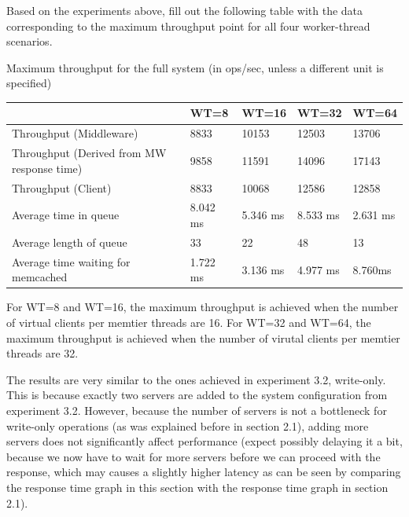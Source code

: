 \documentclass[11pt,a4paper]{article}
\begin{document}
Based on the experiments above, fill out the following table with the data corresponding to the maximum throughput point for all four worker-thread scenarios.

\begin{center}
	{Maximum throughput for the full system (in ops/sec, unless a different unit is specified) }
	\begin{tabular}{|l|p{1.5cm}|p{1.5cm}|p{1.5cm}|p{1.5cm}|}
		\hline                                            									& WT=8 & WT=16 & WT=32 & WT=64 \\ 
		\hline Throughput (Middleware)   								& 8833 & 10153 & 12503 & 13706 \\ 
		\hline Throughput (Derived from MW response time) & 9858 & 11591 & 14096 & 17143  \\ 
		\hline Throughput (Client)              								& 8833 & 10068 & 12586 & 12858 \\ 
		\hline Average time in queue            							& 8.042 ms & 5.346 ms &  8.533 ms & 2.631 ms       \\ 
		\hline Average length of queue                    				&  33    		 &   22   	&  48  &   13   \\ 
		\hline Average time waiting for memcached         		& 1.722 ms  & 3.136 ms &  4.977 ms     & 8.760ms       \\ 
		\hline 
	\end{tabular}
\end{center}

For WT=8 and WT=16, the maximum throughput is achieved when the number of virtual clients per memtier threads are 16.
For WT=32 and WT=64, the maximum throughput is achieved when the number of virutal clients per memtier threads are 32.

The results are very similar to the ones achieved in experiment 3.2, write-only.
This is because exactly two servers are added to the system configuration from experiment 3.2.
However, because the number of servers is not a bottleneck for write-only operations (as was explained before in section 2.1), adding more servers does not significantly affect performance (expect possibly delaying it a bit, because we now have to wait for more servers before we can proceed with the response, which may causes a slightly higher latency as can be seen by comparing the response time graph in this section with the response time graph in section 2.1). 
\end{document}
